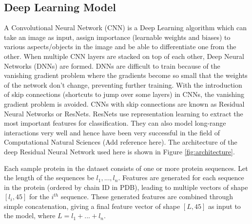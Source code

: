 \documentclass[journal=jacsat,manuscript=article]{achemso}
\begin{document}




\subsection{Deep Learning Model}
\quad A Convolutional Neural Network (CNN) is a Deep Learning algorithm which can take an image as input, assign importance (learnable weights and biases) to various aspects/objects in the image and be able to differentiate one from the other. When multiple CNN layers are stacked on top of each other, Deep Neural Networks (DNNs) are formed. DNNs are difficult to train because of the vanishing gradient problem where the gradients become so small that the weights of the network don't change, preventing further training. With the introduction of skip connections (shortcuts to jump over some layers) in CNNs, the vanishing gradient problem is avoided. CNNs with skip connections are known as Residual Neural Networks or ResNets. ResNets use representation learning to extract the most important features for classification. They can also model long-range interactions very well and hence have been very successful in the field of Computational Natural Sciences (Add reference here).  The architecture of the deep Residual Neural Network used here is shown in Figure \ref{fig:architecture}.

Each sample protein in the dataset consists of one or more protein sequences. Let the length of the sequences be $l_1, ..., l_n$. Features are generated for each sequence in the protein (ordered by chain ID in PDB), leading to multiple vectors of shape $[l_i, 45]$ for the $i^{th}$ sequence. These generated features are combined through simple concatenation, giving a final feature vector of shape $[L, 45]$ as input to the model, where $L = l_1 + ... + l_n$.
\end{document}
